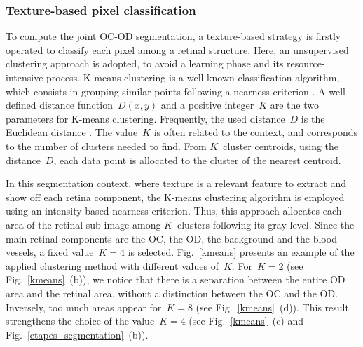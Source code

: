 \subsubsection{\label{pixel_classification}Texture-based pixel classification}

To compute the joint OC-OD segmentation, a texture-based strategy is firstly operated to classify each pixel among a retinal structure. Here, an unsupervised clustering approach is adopted, to avoid a learning phase and its resource-intensive process. K-means clustering is a well-known classification algorithm, which consists in grouping similar points following a nearness criterion \citep{kmeans}. A well-defined distance \mbox{function $D(x,y)$} and a positive \mbox{integer $K$} are the two parameters for K-means clustering. Frequently, the used \mbox{distance $D$} is the Euclidean distance \citep{kodinariya}. The \mbox{value $K$} is often related to the context, and corresponds to the number of clusters needed to find. From \mbox{$K$ cluster} centroids, using the \mbox{distance $D$}, each data point is allocated to the cluster of the nearest centroid.

In this segmentation context, where texture is a relevant feature to extract and show off each retina component, the K-means clustering algorithm is employed using an intensity-based nearness criterion. Thus, this approach allocates each area of the retinal sub-image among \mbox{$K$ clusters} following its gray-level. Since the main retinal components are the OC, the OD, the background and the blood vessels, a fixed \mbox{value $K = 4$} is selected.
\mbox{Fig. \ref{kmeans}} presents an example of the applied clustering method with different values \mbox{of $K$}. \mbox{For $K = 2$} (see \mbox{Fig. \ref{kmeans} (b)}), we notice that there is a separation between the entire OD area and the retinal area, without a distinction between the OC and the OD. Inversely, too much areas appear \mbox{for $K = 8$} (see \mbox{Fig. \ref{kmeans} (d)}). This result strengthens the choice of the \mbox{value $K = 4$} (see \mbox{Fig. \ref{kmeans} (c)} and \mbox{Fig. \ref{etapes_segmentation} (b)}). 

